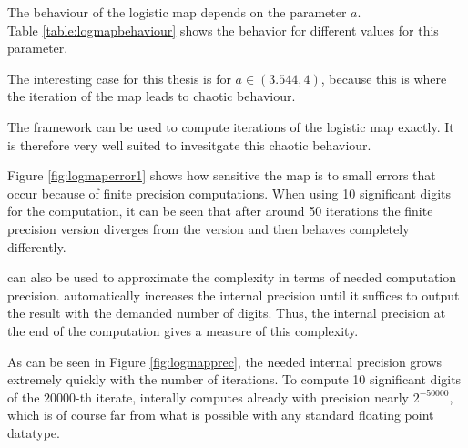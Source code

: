   The behaviour of the logistic map depends on the parameter $a$.\\
  Table \ref{table:logmapbehaviour} shows the behavior for different values for this parameter.

  The interesting case for this thesis is for $a \in (3.544, 4)$, because this is  where the iteration of the map leads to chaotic behaviour.

  The \irram framework can be used to compute iterations of the logistic map exactly. It is therefore very well suited to invesitgate this chaotic behaviour.
  
  Figure \ref{fig:logmaperror1} shows how sensitive the map is to small errors that occur because of finite precision computations. 
  When using 10 significant digits for the computation, it can be seen that after around 50 iterations the finite precision version diverges from the \irram version and then behaves completely differently. 

  \irram can also be used to approximate the complexity in terms of needed computation precision. 
  \irram automatically increases the internal precision until it suffices to output the result with the demanded number of digits.
  Thus, the internal precision at the end of the computation gives a measure of this complexity. 

  As can be seen in Figure \ref{fig:logmapprec}, the needed internal precision grows extremely quickly with the number of iterations.
  To compute 10 significant digits of the $20000$-th iterate, \irram interally computes already with precision nearly $2^{-50000}$, which is of course far from what is possible with any standard floating point datatype.   
